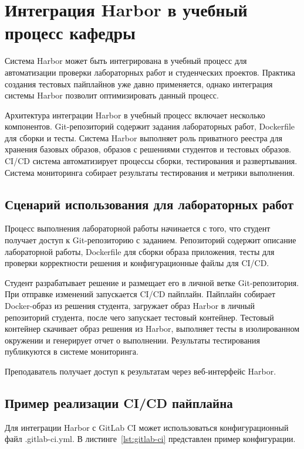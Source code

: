 \section{Интеграция Harbor в учебный процесс кафедры}
\label{subsec:harbor-education}

Система Harbor может быть интегрирована в учебный процесс для автоматизации проверки лабораторных работ и студенческих проектов. Практика создания тестовых пайплайнов уже давно применяется, однако интеграция системы Harbor позволит оптимизировать данный процесс.

Архитектура интеграции Harbor в учебный процесс включает несколько компонентов. Git-репозиторий содержит задания лабораторных работ, Dockerfile для сборки и тесты. Система Harbor выполняет роль приватного реестра для хранения базовых образов, образов с решениями студентов и тестовых образов. CI/CD система автоматизирует процессы сборки, тестирования и развертывания. Система мониторинга собирает результаты тестирования и метрики выполнения.

\subsection{Сценарий использования для лабораторных работ}

Процесс выполнения лабораторной работы начинается с того, что студент получает доступ к Git-репозиторию с заданием. Репозиторий содержит описание лабораторной работы, Dockerfile для сборки образа приложения, тесты для проверки корректности решения и конфигурационные файлы для CI/CD.

Студент разрабатывает решение и размещает его в личной ветке Git-репозитория. При отправке изменений запускается CI/CD пайплайн. Пайплайн собирает Docker-образ из решения студента, загружает образ Harbor в личный репозиторий студента, после чего запускает тестовый контейнер. Тестовый контейнер скачивает образ решения из Harbor, выполняет тесты в изолированном окружении и генерирует отчет о выполнении. Результаты тестирования публикуются в системе мониторинга.

Преподаватель получает доступ к результатам через веб-интерфейс Harbor.

\clearpage

\subsection{Пример реализации CI/CD пайплайна}

Для интеграции Harbor с GitLab CI может использоваться конфигурационный файл .gitlab-ci.yml. В листинге~\ref{lst:gitlab-ci} представлен пример конфигурации.

